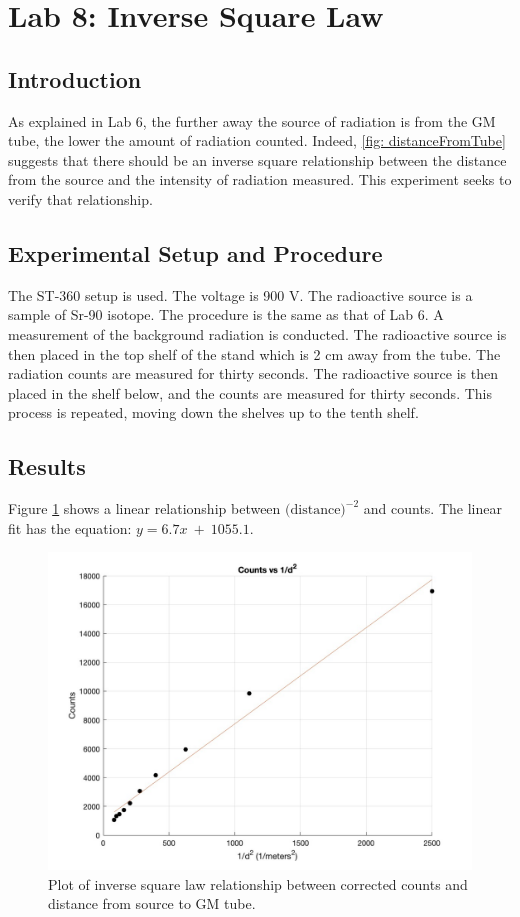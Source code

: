 \documentclass[reprint,amsmath,amssymb,aps,prl]{revtex4-2}
\begin{document}
\section{Lab 8: Inverse Square Law}

\subsection{Introduction}
As explained in Lab 6, the further away the source of radiation is from the GM tube, the lower the amount of radiation counted. Indeed, \ref{fig: distanceFromTube} suggests that there should be an inverse square relationship between the distance from the source and the intensity of radiation measured. This experiment seeks to verify that relationship.

\subsection{Experimental Setup and Procedure}
The ST-360 setup is used. The voltage is 900 V. The radioactive source is a sample of Sr-90 isotope.  The procedure is the same as that of Lab 6. A measurement of the background radiation is conducted. The radioactive source is then placed in the top shelf of the stand which is 2 cm away from the tube. The radiation counts are measured for thirty seconds. The radioactive source is then placed in the shelf below, and the counts are measured for thirty seconds. This process is repeated, moving down the shelves up to the tenth shelf. 

\subsection{Results}
Figure \ref{fig: lab8_plot} shows a linear relationship between $\text{(distance)}^{-2}$ and counts. The linear fit has the equation: $y = 6.7 x \ + \ 1055.1$. 



\begin{figure}
    \centering
    \includegraphics[width = \columnwidth]{lab8_plot.jpg}
    \caption{Plot of inverse square law relationship between corrected counts and distance from source to GM tube.}
    \label{fig: lab8_plot}
\end{figure}
\end{document}
